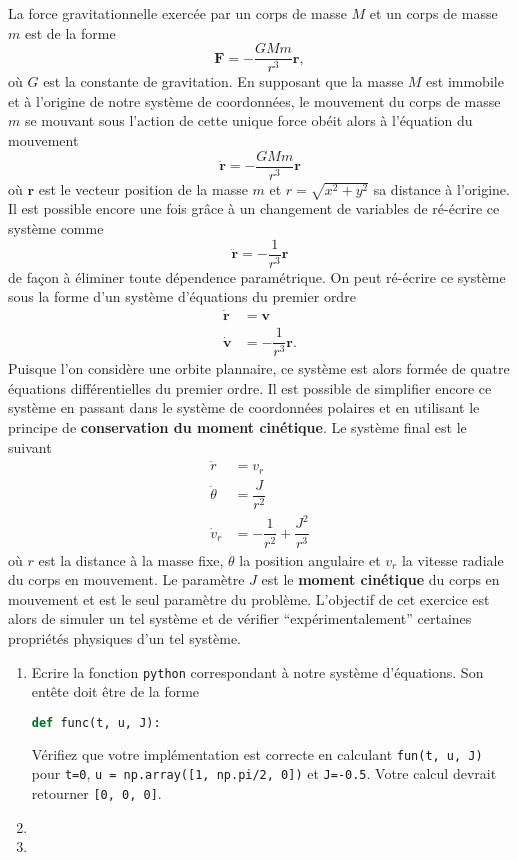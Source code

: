 \documentclass[a4paper,12pt]{article} %
\begin{document}
La force gravitationnelle exercée par un corps de masse $M$ et un corps de masse $m$ est de la forme
%
\[
\bm{F} = -\dfrac{GMm}{r^3} \bm{r},
\]
%
où $G$ est la constante de gravitation.
En supposant que la masse $M$ est immobile et à l'origine de notre système de coordonnées, le mouvement du corps de masse $m$ se mouvant sous l'action de cette unique force obéit alors à l'équation du mouvement
%
\[
\ddot{\bm{r}} = -\dfrac{GMm}{r^3} \bm{r}
\]
%
où $\bm{r}$ est le vecteur position de la masse $m$ et $r = \sqrt{x^2 + y^2}$ sa distance à l'origine.
Il est possible encore une fois grâce à un changement de variables de ré-écrire ce système comme
%
\[
\ddot{\bm{r}} = -\dfrac{1}{r^3} \bm{r}
\]
%
de façon à éliminer toute dépendence paramétrique.
On peut ré-écrire ce système sous la forme d'un système d'équations du premier ordre
%
\[
\begin{aligned}
  \dot{\bm{r}} & = \bm{v} \\
  \dot{\bm{v}} & = -\dfrac{1}{r^3} \bm{r}.
\end{aligned}
\]
%
Puisque l'on considère une orbite plannaire, ce système est alors formée de quatre équations différentielles du premier ordre.
Il est possible de simplifier encore ce système en passant dans le système de coordonnées polaires et en utilisant le principe de \textbf{conservation du moment cinétique}.
Le système final est le suivant
%
\[
\begin{aligned}
  \dot{r} & = v_r \\
  \dot{\theta} & = \dfrac{J}{r^2} \\
  \dot{v}_r & = -\dfrac{1}{r^2} + \dfrac{J^2}{r^3}
\end{aligned}
\]
%
où $r$ est la distance à la masse fixe, $\theta$ la position angulaire et $v_r$ la vitesse radiale du corps en mouvement.
Le paramètre $J$ est le \textbf{moment cinétique} du corps en mouvement et est le seul paramètre du problème.
L'objectif de cet exercice est alors de simuler un tel système et de vérifier ``expérimentalement'' certaines propriétés physiques d'un tel système.

\begin{enumerate}
\item Ecrire la fonction \verb+python+ correspondant à notre système d'équations.
  Son entête doit être de la forme
  \begin{lstlisting}[language=Python]
    def func(t, u, J):
  \end{lstlisting}
  Vérifiez que votre implémentation est correcte en calculant \verb+fun(t, u, J)+ pour \verb+t=0+, \verb+u = np.array([1, np.pi/2, 0])+ et \verb+J=-0.5+.
  Votre calcul devrait retourner \verb+[0, 0, 0]+.

\item 

\item 
\end{enumerate}
\end{document}
